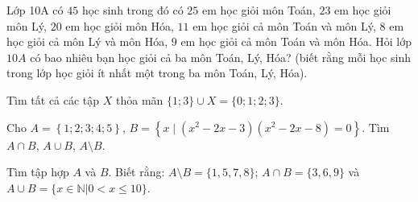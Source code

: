 \begin{bt}%
	Lớp 10A có $45$ học sinh trong đó có $25$ em học giỏi môn Toán, $23$ em học giỏi môn Lý, $20$ em học giỏi  môn Hóa, $11$ em học giỏi cả môn Toán và môn Lý, $8$ em học giỏi cả môn Lý và môn Hóa, $9$ em học giỏi cả môn Toán và môn Hóa. Hỏi lớp $10A$ có bao nhiêu bạn học giỏi cả ba môn Toán, Lý, Hóa? (biết rằng mỗi học sinh trong lớp học giỏi ít nhất một trong ba môn Toán, Lý, Hóa).
\end{bt}

\begin{bt}%
	Tìm tất cả các tập $X$ thỏa  mãn $\{1;3\}\cup X= \{0;1;2;3\}$.
\end{bt}

\begin{bt}%
	Cho $A= \left\{ 1;2;3;4;5 \right\} $, $B=\left\{x \mid  (x^2-2x-3)(x^2-2x-8)=0\right\}$. Tìm $A \cap B$, $A \cup B$, $A \setminus B$.
\end{bt}

\begin{bt}%
	Tìm  tập hợp $ A $ và $B$. Biết rằng: $ A \setminus B = \{1,5,7,8\} $; $ A \cap B = \{3,6,9\} $ và $ A \cup B =\{x \in \mathbb{N}|0<x\le 10\} $.
\end{bt}

